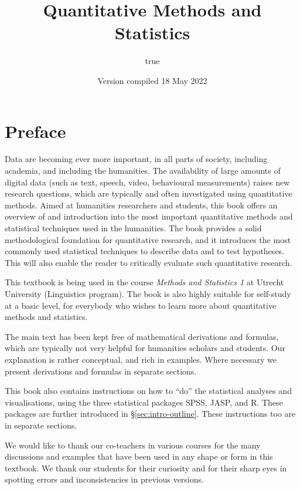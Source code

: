 \documentclass[
]{book}
\title{Quantitative Methods and Statistics}
\author{true}
\date{Version compiled 18 May 2022}
\begin{document}
\maketitle

{
\setcounter{tocdepth}{1}
\tableofcontents
}
\hypertarget{preface}{%
\chapter*{Preface}\label{preface}}

Data are becoming ever more important, in all parts of society, including academia, and including the humanities. The availability of large amounts of digital data (such as text, speech, video, behavioural measurements) raises new research questions, which are typically and often investigated using quantitative methods.
Aimed at humanities researchers and students, this book offers an overview of and introduction into the most important quantitative methods and statistical techniques used in the humanities. The book provides a solid methodological foundation for quantitative research, and it introduces the most commonly used statistical techniques to describe data and to test hypotheses. This will also enable the reader to critically evaluate such quantitative research.

This textbook is being used in the course \emph{Methods and Statistics 1} at Utrecht University (Linguistics program). The book is also highly suitable for self-study at a basic level, for everybody who wishes to learn more about quantitative methods and statistics.

The main text has been kept free of mathematical derivations and formulas, which are typically not very helpful for humanities scholars and students. Our explanation is rather conceptual, and rich in examples. Where necessary we present derivations and formulas in separate sections.

This book also contains instructions on how to ``do'' the statistical analyses and visualisations, using the three statistical packages SPSS, JASP, and R. These packages are further introduced in §\ref{sec:intro-outline}. These instructions too are in separate sections.

We would like to thank our co-teachers in various courses for the many discussions and examples that have been used in any shape or form in this textbook. We thank our students for their curiosity and for their sharp eyes in spotting errors and inconsistencies in previous versions.
\end{document}
